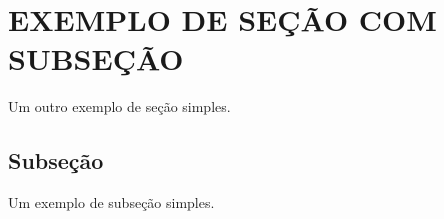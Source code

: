 \section{EXEMPLO DE SEÇÃO COM SUBSEÇÃO}
\label{sec:secao_2_intro}
Um outro exemplo de seção simples. 

\subsection{Subseção}
\label{subsec:subsecao_2_1}
Um exemplo de subseção simples. 

